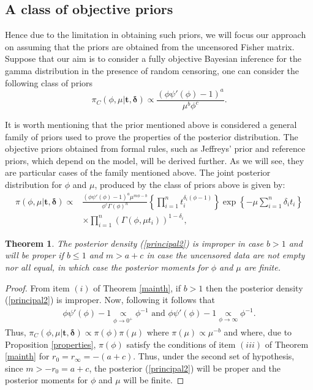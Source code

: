 \documentclass[12pt]{article} %
\theoremstyle{plain}%
\newtheorem{theorem}{Theorem}[section]
\theoremstyle{definition}
\theoremstyle{remark}
\begin{document}
\subsection{A class of objective priors}

Hence due to the limitation in obtaining such priors, we will focus our approach on assuming that the priors are obtained from the uncensored Fisher matrix. Suppose that our aim is to consider a fully objective Bayesian inference for the gamma distribution in the presence of random censoring, one can consider the following class of priors
\begin{equation}\label{postunnk1} 
\pi_C(\phi,\mu|\boldsymbol{t,\delta})\propto\frac{(\phi\psi'(\phi)-1)^{a}}{\mu^{b}\phi^{c}}.
\end{equation}

It is worth mentioning that the prior mentioned above is considered a general family of priors used to prove the properties of the posterior distribution. The objective priors obtained from formal rules, such as Jeffreys' prior and reference priors, which depend on the model, will be derived further. As we will see, they are particular cases of the family mentioned above.
The joint posterior distribution for $\phi$ and $\mu$, produced by the class of priors above is given by:
\begin{align}\label{principal2}
\pi(\phi,\mu|\boldsymbol{t,\delta})\propto& \frac{(\phi\psi'(\phi)-1)^{a}\mu^{m\phi-b}}{\phi^{c}\Gamma(\phi)^n}\left\{\prod_{i=1}^n{t_i^{\delta_i(\phi-1)}}\right\}\exp\left\{-\mu\sum_{i=1}^n {\delta_i}t_i\right\}\nonumber\\ 
&\times\prod_{i=1}^n\left(\Gamma(\phi,\mu t_i)\right)^{1-\delta_i},
\end{align}

\begin{theorem}\label{principalnow} The posterior density (\ref{principal2}) is improper in case $b>1$ and will be proper if $b\leq 1$ and $m>a+c$ in case the uncensored data are not empty nor all equal, in which case the posterior moments for $\phi$ and $\mu$ are finite.
\end{theorem}
\begin{proof} From item $(i)$ of Theorem \ref{mainth}, if $b>1$ then the posterior density (\ref{principal2}) is improper. Now, following \cite{Pedro2020onposterior} it follows that
\begin{align*}
\phi \psi'(\phi) - 1 \underset{\phi\to 0^+}{\propto} \phi^{-1}\mbox{ and }
\phi\psi'(\phi) - 1 \underset{\phi\to \infty}{\propto} \phi^{-1}.
\end{align*}
Thus, $\pi_C(\phi,\mu|\boldsymbol{t,\delta})\propto \pi(\phi)\pi(\mu)$ where $\pi(\mu)\propto \mu^{-b}$ and where, due to Proposition \ref{properties}, $\pi(\phi)$ satisfy the conditions of item $(iii)$ of Theorem \ref{mainth} for $r_0=r_\infty=-(a+c)$. Thus, under the second set of hypothesis, since $m>-r_0=a+c$, the posterior (\ref{principal2}) will be proper and the posterior moments for $\phi$ and $\mu$ will be finite.
\end{proof}
\end{document}
